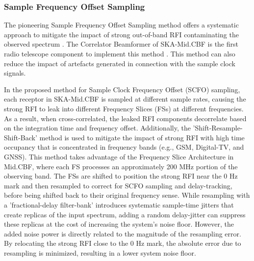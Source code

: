 \subsubsection{Sample Frequency Offset Sampling}

The pioneering Sample Frequency Offset Sampling method offers a systematic approach to mitigate the impact of strong out-of-band RFI contaminating the observed spectrum \citep{carlson_scfo_2017}. The Correlator Beamformer of SKA-Mid.CBF is the first radio telescope component to implement this method \citep{ska_mid_cbf_rfi_2019}. This method can also reduce the impact of artefacts generated in connection with the sample clock signals. 

In the proposed method for Sample Clock Frequency Offset (SCFO) sampling, each receptor in SKA-Mid.CBF is sampled at different sample rates, causing the strong RFI to leak into different Frequency Slices (FSs) at different frequencies. As a result, when cross-correlated, the leaked RFI components decorrelate based on the integration time and frequency offset. Additionally, the 'Shift-Resample-Shift-Back' method is used to mitigate the impact of strong RFI with high time occupancy that is concentrated in frequency bands (e.g., GSM, Digital-TV, and GNSS). This method takes advantage of the Frequency Slice Architecture in Mid.CBF, where each FS processes an approximately 200 MHz portion of the observing band. The FSs are shifted to position the strong RFI near the 0 Hz mark and then resampled to correct for SCFO sampling and delay-tracking, before being shifted back to their original frequency sense. While resampling with a 'fractional-delay filter-bank' introduces systematic sample-time jitters that create replicas of the input spectrum, adding a random delay-jitter can suppress these replicas at the cost of increasing the system's noise floor. However, the added noise power is directly related to the magnitude of the resampling error. By relocating the strong RFI close to the 0 Hz mark, the absolute error due to resampling is minimized, resulting in a lower system noise floor.